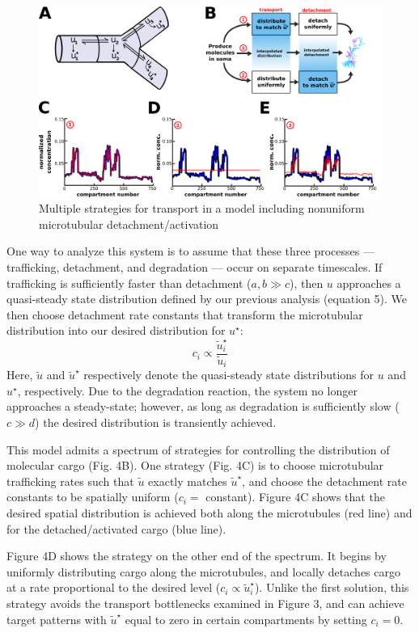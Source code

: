 \documentclass[10pt]{wlpeerj}
\begin{document}
\begin{figure}[!htbp]
\begin{center}
\includegraphics[width=0.9\columnwidth]{04_sushi_belt.png}
\caption{Multiple strategies for transport in a model including nonuniform microtubular detachment/activation}
\end{center}
\end{figure}

One way to analyze this system is to assume that these three processes --- trafficking, detachment, and degradation --- occur on separate timescales. If trafficking is sufficiently faster than detachment ($a,b \gg c$), then $u$ approaches a quasi-steady state distribution defined by our previous analysis (equation 5). We then choose detachment rate constants that transform the microtubular distribution into our desired distribution for $u^\star$:
\begin{equation}
c_i \propto \frac{\tilde{u}^\star_i}{\tilde{u}_i}
\end{equation}
Here, $\tilde{u}$ and $\tilde{u}^\star$ respectively denote the quasi-steady state distributions for $u$ and $u^\star$, respectively. Due to the degradation reaction, the system no longer approaches a steady-state; however, as long as degradation is sufficiently slow ($c \gg d$) the desired distribution is transiently achieved.

This model admits a spectrum of strategies for controlling the distribution of molecular cargo (Fig. 4B). One strategy (Fig. 4C) is to choose microtubular trafficking rates such that $\tilde{u}$ exactly matches $\tilde{u}^\star$, and choose the detachment rate constants to be spatially uniform ($c_i =$ constant). Figure 4C shows that the desired spatial distribution is achieved both along the microtubules (red line) and for the detached/activated cargo (blue line).

Figure 4D shows the strategy on the other end of the spectrum. It begins by uniformly distributing cargo along the microtubules, and locally detaches cargo at a rate proportional to the desired level ($c_i \propto \tilde{u}^\star_i$). Unlike the first solution, this strategy avoids the transport bottlenecks examined in Figure 3, and can achieve target patterns with  $\tilde{u}^\star$ equal to zero in certain compartments by setting $c_i = 0$. 
\end{document}
